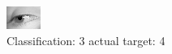 \begin{figure}[h!]
\begin{center}
\includegraphics[width=0.60\columnwidth]{figures/ID3008_class_3_target_4.png}
\end{center}
\caption{ Classification: 3 actual target: 4}
\label{fig:ID3008_class_3_target_4}
\end{figure}
